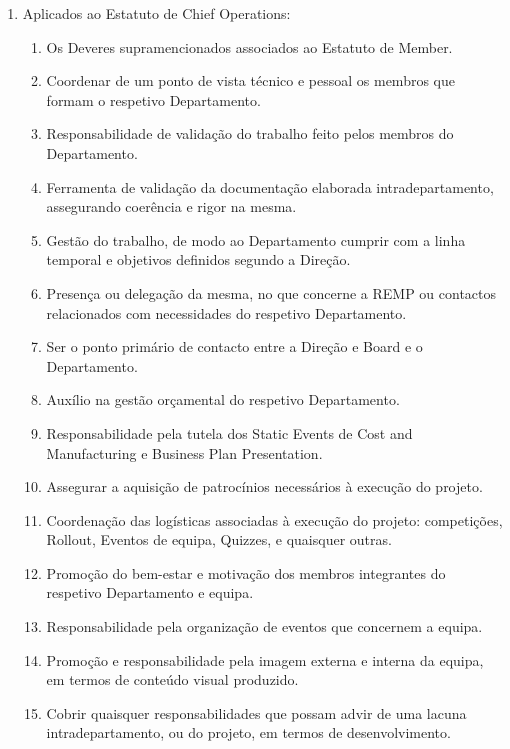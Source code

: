 \begin{enumerate}
\begin{enumerate}
    \item Aplicados ao Estatuto de Chief Operations:
    \begin{enumerate}
      \item Os Deveres supramencionados associados ao Estatuto de Member.
      \item Coordenar de um ponto de vista técnico e pessoal os membros que formam o respetivo Departamento.
      \item Responsabilidade de validação do trabalho feito pelos membros do Departamento.
      \item Ferramenta de validação da documentação elaborada intradepartamento, assegurando coerência e rigor na mesma.
      \item Gestão do trabalho, de modo ao Departamento cumprir com a linha temporal e objetivos definidos segundo a Direção.
      \item Presença ou delegação da mesma, no que concerne a REMP ou contactos relacionados com necessidades do respetivo Departamento.
      \item Ser o ponto primário de contacto entre a Direção e Board e o Departamento.
      \item Auxílio na gestão orçamental do respetivo Departamento.
      \item Responsabilidade pela tutela dos Static Events de Cost and Manufacturing e Business Plan Presentation.
      \item Assegurar a aquisição de patrocínios necessários à execução do projeto.
      \item Coordenação das logísticas associadas à execução do projeto: competições, Rollout, Eventos de equipa, Quizzes, e quaisquer outras.
      \item Promoção do bem-estar e motivação dos membros integrantes do respetivo Departamento e equipa.
      \item Responsabilidade pela organização de eventos que concernem a equipa.
      \item Promoção e responsabilidade pela imagem externa e interna da equipa, em termos de conteúdo visual produzido.
      \item Cobrir quaisquer responsabilidades que possam advir de uma lacuna intradepartamento, ou do projeto, em termos de desenvolvimento.
    \end{enumerate}


\end{enumerate}
\end{enumerate}
